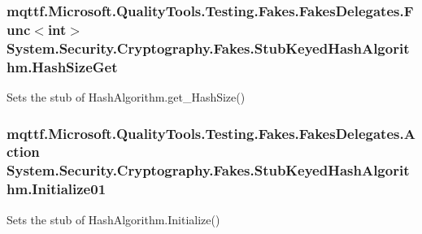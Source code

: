\hypertarget{class_system_1_1_security_1_1_cryptography_1_1_fakes_1_1_stub_keyed_hash_algorithm_a7d6d78cef8b2720bcab11ad62561d8d0}{
\subsubsection[{Hash\-Size\-Get}]{\setlength{\rightskip}{0pt plus 5cm}mqttf.\-Microsoft.\-Quality\-Tools.\-Testing.\-Fakes.\-Fakes\-Delegates.\-Func$<$int$>$ System.\-Security.\-Cryptography.\-Fakes.\-Stub\-Keyed\-Hash\-Algorithm.\-Hash\-Size\-Get}}\label{class_system_1_1_security_1_1_cryptography_1_1_fakes_1_1_stub_keyed_hash_algorithm_a7d6d78cef8b2720bcab11ad62561d8d0}


Sets the stub of Hash\-Algorithm.\-get\-\_\-\-Hash\-Size()

\hypertarget{class_system_1_1_security_1_1_cryptography_1_1_fakes_1_1_stub_keyed_hash_algorithm_a44deeb7e07e35c894650678c685c7fc9}{
\subsubsection[{Initialize01}]{\setlength{\rightskip}{0pt plus 5cm}mqttf.\-Microsoft.\-Quality\-Tools.\-Testing.\-Fakes.\-Fakes\-Delegates.\-Action System.\-Security.\-Cryptography.\-Fakes.\-Stub\-Keyed\-Hash\-Algorithm.\-Initialize01}}\label{class_system_1_1_security_1_1_cryptography_1_1_fakes_1_1_stub_keyed_hash_algorithm_a44deeb7e07e35c894650678c685c7fc9}


Sets the stub of Hash\-Algorithm.\-Initialize()

